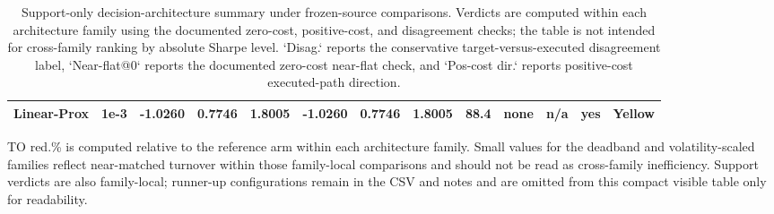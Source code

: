 \begin{table}[t]
{\begin{tabular}{llrrrrrrrllll}
Linear-Prox & 1e-3 & -1.0260 & 0.7746 & 1.8005 & -1.0260 & 0.7746 & 1.8005 & 88.4 & none & n/a & yes & Yellow \\
\bottomrule
\end{tabular}
}
\par\smallskip\parbox{0.98\columnwidth}{\scriptsize TO red.\% is computed relative to the reference arm within each architecture family. Small values for the deadband and volatility-scaled families reflect near-matched turnover within those family-local comparisons and should not be read as cross-family inefficiency. Support verdicts are also family-local; runner-up configurations remain in the CSV and notes and are omitted from this compact visible table only for readability.}
\caption{Support-only decision-architecture summary under frozen-source comparisons. Verdicts are computed within each architecture family using the documented zero-cost, positive-cost, and disagreement checks; the table is not intended for cross-family ranking by absolute Sharpe level. `Disag.` reports the conservative target-versus-executed disagreement label, `Near-flat@0` reports the documented zero-cost near-flat check, and `Pos-cost dir.` reports positive-cost executed-path direction.}
\label{tab:decision_architecture_summary}
\end{table}
